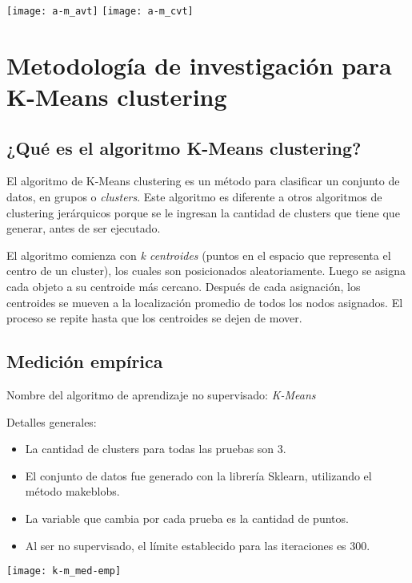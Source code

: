 \documentclass{article}
\begin{document}
\begin{center}
  \texttt{[image: a-m\_avt]}
  \texttt{[image: a-m\_cvt]}
\end{center}


\section{Metodología de investigación para K-Means clustering}
\subsection{¿Qué es el algoritmo K-Means clustering?}
El algoritmo de K-Means clustering es un método para clasificar un conjunto de datos, en grupos o \textit{clusters}. Este algoritmo es diferente a otros algoritmos de clustering jerárquicos porque se le ingresan la cantidad de clusters que tiene que generar, antes de ser ejecutado.

El algoritmo comienza con \textit{k centroides} (puntos en el espacio que representa el centro de un cluster), los cuales son posicionados aleatoriamente. Luego se asigna cada objeto a su centroide más cercano. Después de cada asignación, los centroides se mueven a la localización promedio de todos los nodos asignados. El proceso se repite hasta que los centroides se dejen de mover. \textcite{oreillyML}

\subsection{Medición empírica}
Nombre del algoritmo de aprendizaje no supervisado: \textit{K-Means}

Detalles generales:

\begin{itemize}
  \item La cantidad de clusters para todas las pruebas son 3.
  \item El conjunto de datos fue generado con la librería Sklearn, utilizando el método make\textunderscore{}blobs.
  \item La variable que cambia por cada prueba es la cantidad de puntos.
  \item Al ser no supervisado, el límite establecido para las iteraciones es 300.
\end{itemize}

\begin{center}
  \texttt{[image: k-m\_med-emp]}
\end{center}
\newpage
\end{document}
